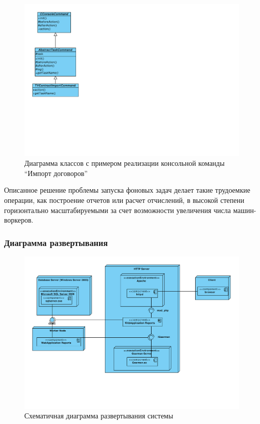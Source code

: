\begin{figure}[!ht]
\begin{center}
\vspace{-0.5cm}
\includegraphics[scale=0.7, trim=10mm 81mm 200mm 10mm, clip]{../resources/uml/AbstractTask.pdf}
\caption{Диаграмма классов с примером реализации консольной команды ``Импорт договоров''}
\label{gr:tasks_class}
\end{center}
\end{figure} 

Описанное решение проблемы запуска фоновых задач делает такие трудоемкие операции, как построение отчетов
или расчет отчислений, в высокой степени горизонтально масштабируемыми за счет возможности увеличения
числа машин-воркеров.

\subsubsection{Диаграмма развертывания}
\begin{figure}[!ht]
\begin{center}
\vspace{-0.5cm}
\includegraphics[scale=0.6, trim=10mm 50mm 0mm 10mm, clip]{../resources/uml/Deployment.pdf}
\caption{Схематичная диаграмма развертывания системы}
\label{gr:deployment}
\end{center}
\end{figure} 

